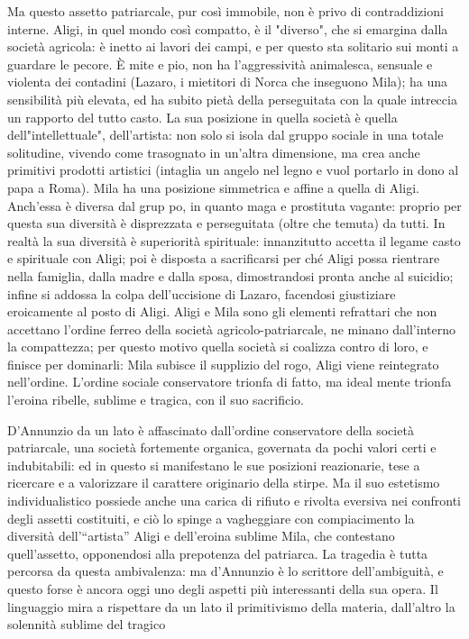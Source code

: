 \documentclass{book}
\newcounter{mar}
\begin{document}
Ma questo assetto patriarcale, pur così immobile, non è privo di contraddizioni interne. Aligi, in quel mondo così compatto, è il "diverso", che si emargina dalla società agricola: è inetto ai lavori dei campi, e per questo sta solitario sui monti a guardare le pecore. È mite e pio, non ha l'aggressività animalesca, sensuale e violenta dei contadini (Lazaro, i mietitori di Norca che inseguono Mila); ha una sensibilità più elevata, ed ha subito pietà della perseguitata con la quale intreccia un rapporto del tutto casto. La sua posizione in quella società è quella dell"intellettuale", dell'artista: non solo si isola dal gruppo sociale in una totale solitudine, vivendo come trasognato in un'altra dimensione, ma crea anche primitivi prodotti artistici (intaglia un angelo nel legno e vuol portarlo in dono al papa a Roma). Mila ha una posizione simmetrica e affine a quella di Aligi. Anch'essa è diversa dal grup po, in quanto maga e prostituta vagante: proprio per questa sua diversità è disprezzata e perseguitata (oltre che temuta) da tutti. In realtà la sua diversità è superiorità spirituale:
innanzitutto accetta il legame casto e spirituale con Aligi; poi è disposta a sacrificarsi per ché Aligi possa rientrare nella famiglia, dalla madre e dalla sposa, dimostrandosi pronta anche al suicidio; infine si addossa la colpa dell'uccisione di Lazaro, facendosi giustiziare eroicamente al posto di Aligi. Aligi e Mila sono gli elementi refrattari che non accettano l'ordine ferreo della società agricolo-patriarcale, ne minano dall'interno la compattezza; per questo motivo quella società si coalizza contro di loro, e finisce per dominarli: Mila subisce il supplizio del rogo, Aligi viene reintegrato nell'ordine. L'ordine sociale conservatore trionfa di fatto, ma ideal mente trionfa l'eroina ribelle, sublime e tragica, con il suo sacrificio.

D'Annunzio da un lato è affascinato dall'ordine conservatore della società patriarcale, una società fortemente organica, governata da pochi valori certi e indubitabili: ed in questo si manifestano le sue posizioni reazionarie, tese a ricercare e a valorizzare il carattere originario della stirpe. Ma il suo estetismo individualistico possiede anche una carica di rifiuto e rivolta eversiva nei confronti degli assetti costituiti, e ciò lo spinge a vagheggiare con compiacimento la diversità dell'``artista” Aligi e dell'eroina sublime Mila, che contestano quell'assetto, opponendosi alla prepotenza del patriarca. La tragedia è tutta percorsa da questa ambivalenza: ma d'Annunzio è lo scrittore dell'ambiguità, e questo forse è ancora oggi uno degli aspetti più interessanti della sua opera. Il linguaggio mira a rispettare da un lato il primitivismo della materia, dall'altro la solennità sublime del tragico
\end{document}
